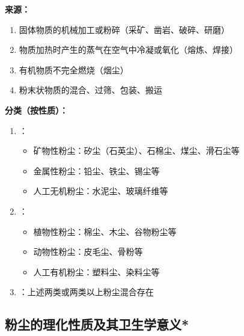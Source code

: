 \begin{keybox}
\textbf{来源：}
\begin{enumerate}[leftmargin=*]
    \item 固体物质的机械加工或粉碎（采矿、凿岩、破碎、研磨）
    \item 物质加热时产生的蒸气在空气中冷凝或氧化（熔炼、焊接）
    \item 有机物质不完全燃烧（烟尘）
    \item 粉末状物质的混合、过筛、包装、搬运
\end{enumerate}

\textbf{分类（按性质）：}
\begin{enumerate}[leftmargin=*]
    \item {}：
    \begin{itemize}
        \item 矿物性粉尘：矽尘（石英尘）、石棉尘、煤尘、滑石尘等
        \item 金属性粉尘：铅尘、铁尘、锡尘等
        \item 人工无机粉尘：水泥尘、玻璃纤维等
    \end{itemize}
    \item {}：
    \begin{itemize}
        \item 植物性粉尘：棉尘、木尘、谷物粉尘等
        \item 动物性粉尘：皮毛尘、骨粉等
        \item 人工有机粉尘：塑料尘、染料尘等
    \end{itemize}
    \item {}：上述两类或两类以上粉尘混合存在
\end{enumerate}
\end{keybox}

\subsection{粉尘的理化性质及其卫生学意义*}

